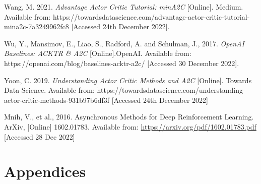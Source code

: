 \documentclass{article}
\begin{document}
Wang, M. 2021. \emph{Advantage Actor Critic Tutorial: minA2C} [Online]. Medium. Available from: https://towardsdatascience.com/advantage-actor-critic-tutorial-mina2c-7a3249962fc8 [Accessed 24th December 2022].

Wu, Y., Mansimov, E., Liao, S., Radford, A. and Schulman, J., 2017. \emph{OpenAI Baselines: ACKTR \& A2C} [Online].OpenAI. Available from: https://openai.com/blog/baselines-acktr-a2c/ [Accessed 30 December 2022].

Yoon, C. 2019. \emph{Understanding Actor Critic Methods and A2C} [Online]. Towards Data Science. Available from: https://towardsdatascience.com/understanding-actor-critic-methods-931b97b6df3f [Accessed 24th December 2022]


\small

Mnih, V., et al., 2016. Asynchronous Methods for Deep Reinforcement Learning. ArXiv, [Online] 1602.01783.
Available from: \url{https://arxiv.org/pdf/1602.01783.pdf} [Accessed 28 Dec 2022]

\normalsize
\newpage
\section*{Appendices}
\end{document}
